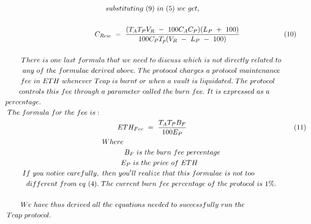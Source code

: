 {\begin{gather}
 \notag\\
substituting\ ( 9) \ in\ ( 5) \ we\ get, \notag\\
 \notag\\
\ \ \ \ \ \ \ \ \ \ \ \ \ \ \ \ \ \ \ \ \ \ \ \ \ \ \ \ \ \ \ \ \ \ \ \ \ C_{Rew} \ =\ \frac{( T_{A} T_{P} V_{R} \ -\ 100C_{A} C_{P})( L_{P} \ +\ 100)}{100C_{P} T_{p}( V_{R} \ -\ L_{P} \ -\ 100)} \ \ \ \ \ \ \ \ \ \ \ \ \ \ \ \ \ \ \ ( 10)\\
 \notag\\
There\ is\ one\ last\ formula\ that\ we\ need\ to\ discuss\ which\ is\ not\ directly\ related\ to\  \notag\\
any\ of\ the\ formulae\ derived\ above.\ The\ protocol\ charges\ a\ protocol\ maintenance\  \notag\\
fee\ in\ ETH\ whenever\ Tcap\ is\ burnt\ or\ when\ a\ vault\ is\ liquidated.\ The\ protocol\ \ \ \  \notag\\
controls\ this\ fee\ through\ a\ parameter\ called\ the\ burn\ fee.\ It\ is\ expressed\ as\ a\ \ \ \ \ \ \  \notag\\
percentage.\ \ \ \ \ \ \ \ \ \ \ \ \ \ \ \ \ \ \ \ \ \ \ \ \ \ \ \ \ \ \ \ \ \ \ \ \ \ \ \ \ \ \ \ \ \ \ \ \ \ \ \ \ \ \ \ \ \ \ \ \ \ \ \ \ \ \ \ \ \ \ \ \ \ \ \ \ \ \ \ \ \ \ \ \ \ \ \ \ \ \ \ \ \ \ \ \ \ \ \ \ \ \ \ \ \ \ \ \ \ \  \notag\\
The\ formula\ for\ the\ fee\ is:\ \ \ \ \ \ \ \ \ \ \ \ \ \ \ \ \ \ \ \ \ \ \ \ \ \ \ \ \ \ \ \ \ \ \ \ \ \ \ \ \ \ \ \ \ \ \ \ \ \ \ \ \ \ \ \ \ \ \ \ \ \ \ \ \ \ \ \ \ \ \ \ \ \ \ \ \ \ \ \ \ \ \ \ \  \notag\\
\ \ \ \ \ \ \ \ \ \ \ \ \ \ \ \ \ \ \ \ \ \ \ \ \ \ \ \ \ \ \ \ \ \ \ \ \ \ \ \ \ \ \ \ \ \ \ \ \ \ \ ETH_{Fee} \ =\ \frac{T_{A} T_{P} B_{F}}{100E_{P}} \ \ \ \ \ \ \ \ \ \ \ \ \ \ \ \ \ \ \ \ \ \ \ \ \ \ \ \ \ \ \ \ \ \ \ \ \ \ \ \ \ \ \ \ \ \ ( 11)\\
Where\ \ \ \ \ \ \ \ \ \ \ \ \ \ \ \ \ \ \ \ \ \ \ \ \ \ \ \ \ \ \ \ \ \  \notag\\
\ \ \ \ \ \ \ \ \ \ \ \ \ \ \ \ \ B_{F} \ is\ the\ burn\ fee\ percentage \notag\\
\ \ \ \ \ \ \ \ \ \ E_{P} \ is\ the\ price\ of\ ETH\ \ \ \  \notag\\
If\ you\ notice\ carefully,\ then\ you'll\ realize\ that\ this\ formulae\ is\ not\ too\ \ \ \ \ \ \ \ \ \ \ \  \notag\\
different\ from\ eq\ ( 4) .\ The\ current\ burn\ fee\ percentage\ of\ the\ protocol\ is\ 1\%.\  \notag\\
 \notag\\
We\ have\ thus\ derived\ all\ the\ equations\ needed\ to\ successfully\ run\ the\ \ \ \ \ \ \ \ \ \ \ \ \ \ \ \ \  \notag\\
Tcap\ protocol.\ \ \ \ \ \ \ \ \ \ \ \ \ \ \ \ \ \ \ \ \ \ \ \ \ \ \ \ \ \ \ \ \ \ \ \ \ \ \ \ \ \ \ \ \ \ \ \ \ \ \ \ \ \ \ \ \ \ \ \ \ \ \ \ \ \ \ \ \ \ \ \ \ \ \ \ \ \ \ \ \ \ \ \ \ \ \ \ \ \ \ \ \ \ \ \ \ \ \ \ \ \ \ \ \ \  \notag\\
 \notag
\end{gather}}

